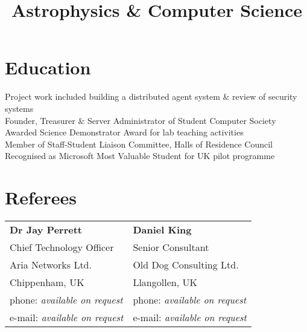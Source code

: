 \documentclass{resume}
\begin{document}
\begin{resume}
\section{Education}

\title{\bf Astrophysics \& Computer Science}
\begin{position}
Project work included building a distributed agent system \& review of security systems  \vspace{1mm}\\
Founder, Treasurer \& Server Administrator of Student Computer Society  \vspace{1mm}\\
Awarded Science Demonstrator Award for lab teaching activities  \vspace{1mm}\\
Member of Staff-Student Liaison Committee, Halls of Residence Council  \vspace{1mm}\\
Recognised as Microsoft Most Valuable Student for UK pilot programme
\end{position}

\section{Referees} 

\begin{tabular}{@{}p{6cm}p{6cm}}
\textbf{Dr Jay Perrett}                 &  \textbf{Daniel King}                     \\
Chief Technology Officer                &  Senior Consultant                        \\
Aria Networks Ltd.                      &  Old Dog Consulting Ltd.                  \\
Chippenham, UK                          &  Llangollen, UK                           \\
phone: \textsl{available on request}    &  phone: \textsl{available on request}     \\
e-mail: \textsl{available on request}   &  e-mail: \textsl{available on request}    \\
\end{tabular}

\end{resume}
\end{document}
